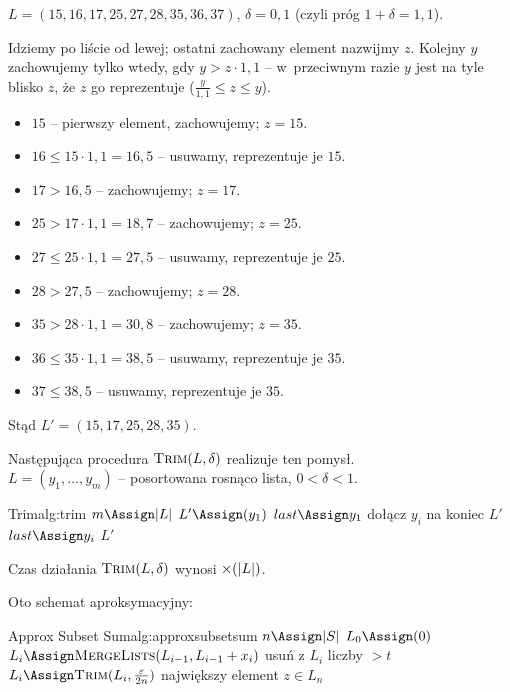\begin{example}
	$L = (15, 16, 17, 25, 27, 28, 35, 36, 37)$, $\delta = 0{,}1$ (czyli próg $1 + \delta = 1{,}1$).

	Idziemy po liście od lewej; ostatni zachowany element nazwijmy $z$. Kolejny $y$ zachowujemy tylko wtedy, gdy $y > z \cdot 1{,}1$ -- w~przeciwnym razie $y$ jest na tyle blisko $z$, że $z$ go reprezentuje ($\frac{y}{1{,}1} \leq z \leq y$).
	\begin{itemize}[nosep]
		\item $15$ -- pierwszy element, zachowujemy; $z = 15$.
		\item $16 \leq 15 \cdot 1{,}1 = 16{,}5$ -- usuwamy, reprezentuje je $15$.
		\item $17 > 16{,}5$ -- zachowujemy; $z = 17$.
		\item $25 > 17 \cdot 1{,}1 = 18{,}7$ -- zachowujemy; $z = 25$.
		\item $27 \leq 25 \cdot 1{,}1 = 27{,}5$ -- usuwamy, reprezentuje je $25$.
		\item $28 > 27{,}5$ -- zachowujemy; $z = 28$.
		\item $35 > 28 \cdot 1{,}1 = 30{,}8$ -- zachowujemy; $z = 35$.
		\item $36 \leq 35 \cdot 1{,}1 = 38{,}5$ -- usuwamy, reprezentuje je $35$.
		\item $37 \leq 38{,}5$ -- usuwamy, reprezentuje je $35$.
	\end{itemize}
	Stąd $L' = (15, 17, 25, 28, 35)$.
\end{example}

Następująca procedura $\Call{Trim}{L, \delta}$ realizuje ten pomysł.\\
$L = (y_1, \ldots, y_m)$ -- posortowana rosnąco lista, $0 < \delta < 1$.

\begin{alg}{Trim}{alg:trim}
	\State $m \Assign |L|$
	\State $L' \Assign (y_1)$
	\State $last \Assign y_1$
	\State dołącz $y_i$ na koniec $L'$
	\State $last \Assign y_i$
	\EndIf
	\EndFor
	\State \Return $L'$
	\EndFunction
\end{alg}

Czas działania $\Call{Trim}{L, \delta}$ wynosi $\mathcal{\Theta}(|L|)$.

Oto schemat aproksymacyjny:

\begin{alg}{Approx Subset Sum}{alg:approxsubsetsum}
	\State $n \Assign |S|$
	\State $L_0 \Assign (0)$
	\State $L_i \Assign \Call{MergeLists}{L_{i-1}, L_{i-1} + x_i}$
	\State usuń z $L_i$ liczby $> t$
	\State $L_i \Assign \Call{Trim}{L_i, \frac{\varepsilon}{2n}}$ 
	\EndFor
	\State \Return największy element $z \in L_n$ 
	\EndFunction
\end{alg}


